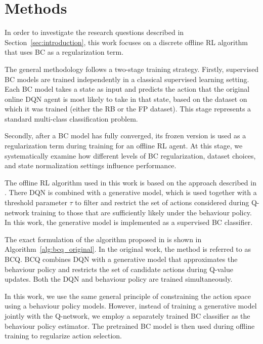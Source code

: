 \cleardoubleoddpage
\chapter{Methods}
\label{app:Methods}

In order to investigate the research questions described in Section~\ref{sec:introduction}, this work focuses on a discrete offline RL algorithm that uses BC as a regularization term.

The general methodology follows a two-stage training strategy. Firstly, supervised BC models are trained independently in a classical supervised learning setting. Each BC model takes a state as input and predicts the action that the original online DQN agent is most likely to take in that state, based on the dataset on which it was trained (either the RB or the FP dataset). This stage represents a standard multi-class classification problem.

Secondly, after a BC model has fully converged, its frozen version is used as a regularization term during training for an offline RL agent. At this stage, we systematically examine how different levels of BC regularization, dataset choices, and state normalization settings influence performance.


The offline RL algorithm used in this work is based on the approach described in \cite{BCQ_benchmarking}. There DQN is combined with a generative model, which is used together with a threshold parameter $\tau$ to filter and restrict the set of actions considered during Q-network training to those that are sufficiently likely under the behaviour policy. In this work, the generative model is implemented as a supervised BC classifier.

The exact formulation of the algorithm proposed in \cite{BCQ_benchmarking} is shown in Algorithm~\ref{alg:bcq_original}. In the original work, the method is referred to as BCQ. BCQ combines DQN with a generative model that approximates the behaviour policy and restricts the set of candidate actions during Q-value updates. Both the DQN and behaviour policy are trained simultaneously. 


In this work, we use the same general principle of constraining the action space using a behaviour policy models. However, instead of training a generative model jointly with the Q-network, we employ a separately trained BC classifier as the behaviour policy estimator. The pretrained BC model is then used during offline training to regularize action selection.

